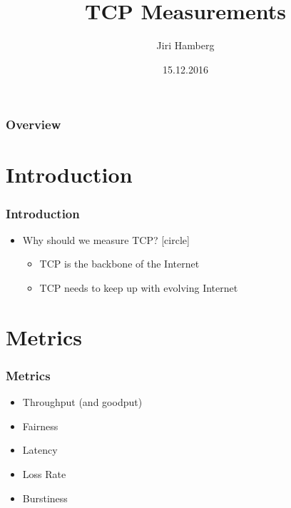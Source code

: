 \documentclass{beamer}
\title[TCP Measurements]{TCP Measurements} %
\author{Jiri Hamberg} %
\institute[Uni.Helsinki] %
{
University of Helsinki \\ %
\medskip
\textit{jiri.hamberg@cs.helsinki.fi} %
}
\date{15.12.2016} %
\begin{document}
\begin{frame}
\titlepage %
\end{frame}

\begin{frame}
\frametitle{Overview} %
\tableofcontents %
\end{frame}


\section{Introduction} 

\begin{frame}
\frametitle{Introduction}

\begin{itemize}
	\item Why should we measure TCP?
	[circle]	
	\begin{itemize}
		\item TCP is the backbone of the Internet
		
		\item TCP needs to keep up with evolving Internet
	\end{itemize}
\end{itemize}

\end{frame}


\section{Metrics}

\begin{frame}
\frametitle{Metrics}
\begin{itemize}
	\item Throughput (and goodput)
	\item Fairness
	\item Latency
	\item Loss Rate
	\item Burstiness	
\end{itemize}
\end{frame}
\end{document}
